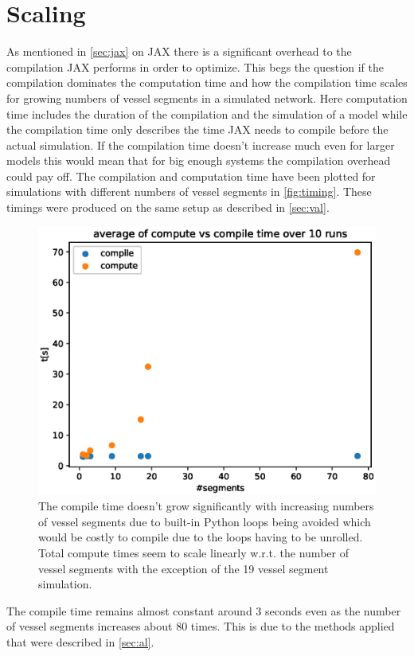 \documentclass[a4paper, oneside]{discothesis}
\begin{document}
\section{Scaling} \label{sec:sc}
As mentioned in \autoref{sec:jax} on JAX there is a significant overhead to the compilation JAX performs in order to optimize.
This begs the question if the compilation dominates the computation time and how the compilation time scales for growing numbers of vessel segments in a simulated network.
Here computation time includes the duration of the compilation and the simulation of a model while the compilation time only describes the time JAX needs to compile before the actual simulation.
If the compilation time doesn't increase much even for larger models this would mean that for big enough systems the compilation overhead could pay off.
The compilation and computation time have been plotted for simulations with different numbers of vessel segments in \autoref{fig:timing}.
These timings were produced on the same setup as described in \autoref{sec:val}.
\begin{figure} [!ht]
	\centering
	\includegraphics[width=0.8\columnwidth]{figures/timing.eps}
	\caption{The compile time doesn't grow significantly with increasing numbers of vessel segments due to built-in Python loops being avoided which would be costly to compile due to the loops having to be unrolled. Total compute times seem to scale linearly w.r.t. the number of vessel segments with the exception of the 19 vessel segment simulation.}
	\label{fig:timing}
\end{figure}
The compile time remains almost constant around 3 seconds even as the number of vessel segments increases about $80$ times.
This is due to the methods applied that were described in \autoref{sec:al}.
\end{document}
